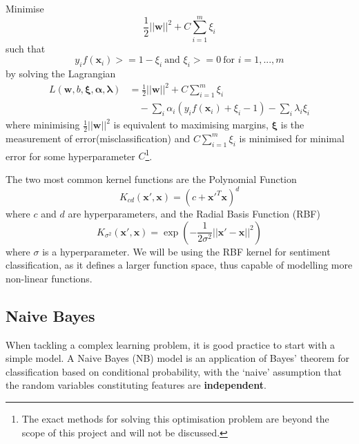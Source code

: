 \documentclass[12pt,a4paper,twoside,openright]{report}
\renewcommand{\vec}[1]{\mathbf{#1}}
\begin{document}
\noindent Minimise
\begin{equation}
\frac{1}{2}||\vec{w}||^2 + C \sum_{i=1}^m \xi_i
\end{equation}
such that
\begin{equation}
y_if(\vec{x}_i) >= 1-\xi_i\ \text{and\ } \xi_i >= 0\ \text{for\ } i = 1,...,m
\end{equation}
by solving the Lagrangian
\begin{equation}
\begin{split}
L(\vec{w}, b, \vec{\xi}, \vec{\alpha}, \vec{\lambda}) &= \frac{1}{2}||\vec{w}||^2 + C \sum_{i=1}^m \xi_i\\
&\quad - \sum_i\alpha_i(y_if(\vec{x}_i) + \xi_i - 1) - \sum_i\lambda_i\xi_i
\end{split}
\end{equation}
where minimising $\frac{1}{2}||\vec{w}||^2$ is equivalent to maximising margins, $\vec{\xi}$ is the measurement
of error(misclassification) and
$C \sum_{i=1}^m \xi_i$ is minimised for minimal error for some hyperparameter $C$\footnote{The exact methods for solving this
optimisation problem are beyond the scope of this project and will not be discussed.}.

The two most common kernel functions are the Polynomial Function
\begin{equation}
	K_{cd}(\vec{x}',\vec{x}) = (c + \vec{x}'^T\vec{x})^d
\end{equation}
where $c$ and $d$ are hyperparameters, and the Radial Basis Function (RBF)
\begin{equation}
	K_{\sigma^2}(\vec{x}',\vec{x}) = \exp(-\frac{1}{2\sigma^2}||\vec{x}'-\vec{x}||^2)
\end{equation}
where $\sigma$ is a hyperparameter. We will be using the RBF kernel for sentiment classification,
as it defines a larger function space, thus capable of modelling more non-linear functions.

\subsection{Naive Bayes}
\label{sec:introNB}

When tackling a complex learning problem, it is good practice to start with
a simple model. A Naive Bayes (NB) model is an application of
Bayes' theorem for classification based on conditional probability, 
with the `naive' assumption that the random variables
constituting features are \textbf{independent}.
\end{document}
